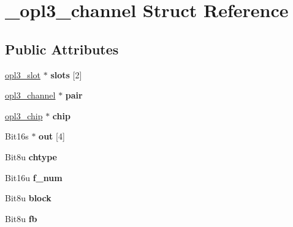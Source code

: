 \hypertarget{struct__opl3__channel}{\section{\-\_\-opl3\-\_\-channel Struct Reference}
\label{struct__opl3__channel}
}
\subsection*{Public Attributes}
\begin{DoxyCompactItemize}
\item 
\hypertarget{struct__opl3__channel_a351286f307090918f7d9fa5137aed9c1}{\hyperlink{struct__opl3__slot}{opl3\-\_\-slot} $\ast$ {\bfseries slots} \mbox{[}2\mbox{]}}\label{struct__opl3__channel_a351286f307090918f7d9fa5137aed9c1}

\item 
\hypertarget{struct__opl3__channel_a86eeca147c7dfd60fe94adec64431135}{\hyperlink{struct__opl3__channel}{opl3\-\_\-channel} $\ast$ {\bfseries pair}}\label{struct__opl3__channel_a86eeca147c7dfd60fe94adec64431135}

\item 
\hypertarget{struct__opl3__channel_aab738f84e6e712455ca57f5562d98400}{\hyperlink{struct__opl3__chip}{opl3\-\_\-chip} $\ast$ {\bfseries chip}}\label{struct__opl3__channel_aab738f84e6e712455ca57f5562d98400}

\item 
\hypertarget{struct__opl3__channel_a745588af94d75421d9b3d4b5aecc453c}{Bit16s $\ast$ {\bfseries out} \mbox{[}4\mbox{]}}\label{struct__opl3__channel_a745588af94d75421d9b3d4b5aecc453c}

\item 
\hypertarget{struct__opl3__channel_abfffd719967c2c8dcc964dddcb34f9c9}{Bit8u {\bfseries chtype}}\label{struct__opl3__channel_abfffd719967c2c8dcc964dddcb34f9c9}

\item 
\hypertarget{struct__opl3__channel_a04191aaa42a6e8bbd7c31fd4e66efa5a}{Bit16u {\bfseries f\-\_\-num}}\label{struct__opl3__channel_a04191aaa42a6e8bbd7c31fd4e66efa5a}

\item 
\hypertarget{struct__opl3__channel_a0724adeb52b8541fee47df23f6cbd375}{Bit8u {\bfseries block}}\label{struct__opl3__channel_a0724adeb52b8541fee47df23f6cbd375}

\item 
\hypertarget{struct__opl3__channel_a0b2efe0e33fae0e98d9e53e66e61c5b7}{Bit8u {\bfseries fb}}\label{struct__opl3__channel_a0b2efe0e33fae0e98d9e53e66e61c5b7}


\end{DoxyCompactItemize}

